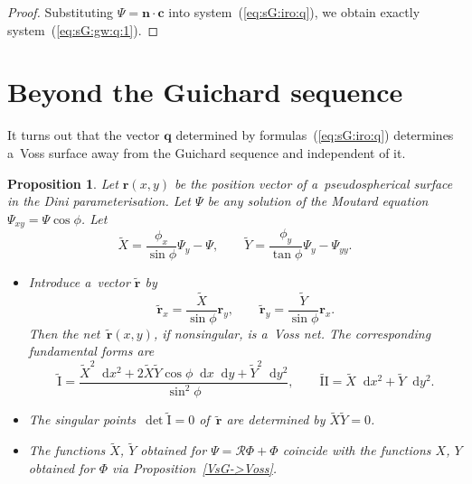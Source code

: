 \documentclass[pdftex]{sigma}
\let\ve\mathbf
\def\eqref#1{{\rm(\ref{#1})}}
\def\dif{\mathop{}\!\mathrm d}
\numberwithin{equation}{section}
\newtheorem{Proposition}[Theorem]{Proposition}
\theoremstyle{definition}
\begin{document}
\begin{proof}
Substituting $\Psi = \ve n \cdot \ve c$ into system~\eqref{eq:sG:iro:q},
we obtain exactly system~\eqref{eq:sG:gw:q:1}.
\end{proof}








\section{Beyond the Guichard sequence}
\label{sect:iRO:Voss}


It turns out that the vector $\ve q$ determined by
formulas~\eqref{eq:sG:iro:q} determines a~Voss surface
away from the Guichard sequence and independent of it.


\begin{Proposition} \label{prop:rtilde}
Let $\ve r(x,y)$ be the position vector of a~pseudospherical surface
in the Dini parameterisation.
Let $\Psi$ be any solution of the Moutard equation
$
\Psi_{xy} = \Psi \cos \phi$.
Let
\[
\tilde X = \frac{\phi_x}{\sin\phi}\Psi_y - \Psi, \qquad
\tilde Y = \frac{\phi_y}{\tan\phi} \Psi_y - \Psi_{yy}.
\]
\begin{itemize}\itemsep=0pt
\item[$(i)$] Introduce a~vector $\tilde{\ve r}$ by
\begin{equation}
\label{eq:sG:iro:rtilde}
\tilde{\ve r}_{x}
 = \frac{\tilde X}{\sin\phi} \ve r_y,
\qquad
\tilde{\ve r}_{y}
 = \frac{\tilde Y}{\sin\phi} \ve r_x.
\end{equation}
Then the net~$\tilde{\ve r}(x,y)$, if nonsingular, is a~Voss net.
The corresponding fundamental forms are
\[
\tilde{\mathrm{I}}
 = \frac{\tilde X^2 \dif x^2
 + 2 \tilde X \tilde Y \cos\phi \dif x \dif y + \tilde Y^2 \dif y^2}
 {\sin^2 \phi},
\qquad
\tilde{\mathrm{II}}
 = \tilde X \dif x^2 + \tilde Y \dif y^2.
\]

\item[$(ii)$] The singular points~$\det \tilde{\mathrm{I}} = 0$
of~$\tilde{\ve r}$ are determined by
$
\tilde X \tilde Y = 0$.

\item[$(iii)$] The functions $\tilde X$, $\tilde Y$ obtained for
$
\Psi = \mathcal R \Phi + \Phi
$
coincide with the functions $X$, $Y$ obtained for $\Phi$
via Proposition~\rm\ref{VsG->Voss}.
\end{itemize}
\end{Proposition}
\end{document}
